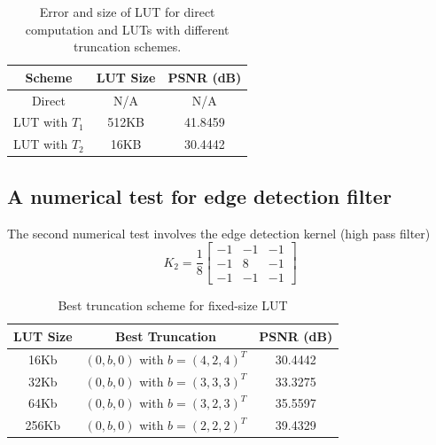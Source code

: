 \documentclass[12pt]{amsart}
\theoremstyle{definition}
\theoremstyle{remark}
\numberwithin{thm}{section}
\begin{document}
\begin{center}
\begin{table}
	 
    \begin{tabular}{ | c | c| c |}
    \hline
    Scheme & LUT Size & PSNR (dB) \\ \hline
    Direct & N/A & N/A  \\ \hline
    LUT with $T_1$ & 512KB & 41.8459 \\ \hline
    LUT with $T_2$ & 16KB & 30.4442 \\ \hline   
    \end{tabular}
    \bigskip
    
    \caption{Error and size of LUT for direct computation and LUTs with different truncation schemes.}
    \label{tbl:low_pass}
\end{table} 
\end{center}

\subsection{A numerical test for edge detection filter}

The second numerical test involves the edge detection kernel (high pass filter)
$$
K_2=\frac{1}{8}
\begin{bmatrix}
-1 & -1 & -1\\
-1 &  8 & -1\\
-1 & -1 & -1
\end{bmatrix}
$$
\begin{center}
\begin{table}
	
    \begin{tabular}{ | c | c | c | }
    \hline
    LUT Size & Best Truncation & PSNR (dB) \\ \hline
    16Kb& $(0,b,0)$ with $b=(4,2,4)^T$ & 30.4442 \\ \hline
    32Kb& $(0,b,0)$ with $b=(3,3,3)^T$ & 33.3275 \\ \hline 
    64Kb& $(0,b,0)$ with $b=(3,2,3)^T$ & 35.5597 \\ \hline 
    256Kb& $(0,b,0)$ with $b=(2,2,2)^T$ & 39.4329 \\ \hline 
    \end{tabular}
    \bigskip
    
    \caption{Best truncation scheme for fixed-size LUT}
    \label{tbl:optimization}
\end{table} 
\end{center}
\end{document}
